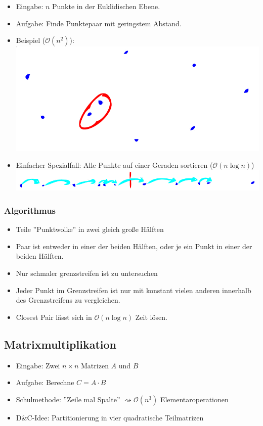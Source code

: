 \documentclass{scrartcl}
\begin{document}
\begin{itemize}
	\item Eingabe: $ n $ Punkte in der Euklidischen Ebene.
	\item Aufgabe: Finde Punktepaar mit geringstem Abstand.
	\item Beispiel ($ \mathcal{O}(n^2) $): \\
	\includegraphics[width=\linewidth]{figures/closest-pair.pdf}
	\item Einfacher Spezialfall: Alle Punkte auf einer Geraden sortieren ($ \mathcal{O}(n \log n) $) \\
	\includegraphics[width=\linewidth]{figures/closest-pair-gerade.pdf}
\end{itemize}

\subsubsection{Algorithmus}

\begin{itemize}
	\item Teile ''Punktwolke'' in zwei gleich große Hälften
	\item Paar ist entweder in einer der beiden Hälften, oder je ein Punkt in einer der beiden Hälften.
	\item Nur schmaler grenzstreifen ist zu untersuchen
	\item Jeder Punkt im Grenzstreifen ist nur mit konstant vielen anderen innerhalb des Grenzstreifens zu vergleichen.
	\item Closest Pair lässt sich in $ \mathcal{O}(n \log n) $ Zeit lösen.
\end{itemize}

\subsection{Matrixmultiplikation}

\begin{itemize}
	\item Eingabe: Zwei $ n \times n $ Matrizen $ A $ und $ B $
	\item Aufgabe: Berechne $ C = A \cdot B $
	\item Schulmethode: ''Zeile mal Spalte'' $ \rightsquigarrow \mathcal{O}(n^3) $ Elementaroperationen
	\item D\&C-Idee: Partitionierung in vier quadratische Teilmatrizen
\end{itemize}
\end{document}

